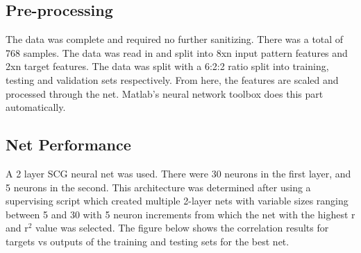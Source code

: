 \documentclass[10pt]{article}
\begin{document}
\subsection{Pre-processing}
The data was complete and required no further sanitizing. There was a total of 768 samples. The data was read in and split into 8xn input pattern features and 2xn target features. The data was split with a 6:2:2 ratio split into training, testing and validation sets respectively. From here, the features are scaled and processed through the net. Matlab's neural network toolbox does this part automatically.
\subsection{Net Performance}
A 2 layer SCG neural net was used. There were 30 neurons in the first layer, and 5 neurons in the second. This architecture was determined after using a supervising script which created multiple 2-layer nets with variable sizes ranging between 5 and 30 with 5 neuron increments from which the net with the highest r and r$^{2}$ value was selected. The figure below shows the correlation results for targets vs outputs of the training and testing sets for the best net.
\end{document}

